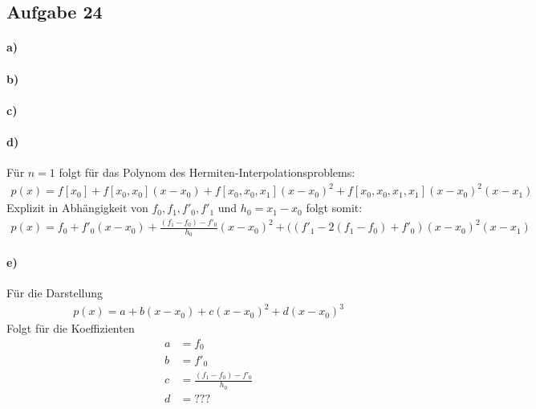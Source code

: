 \subsection*{Aufgabe 24}

\paragraph*{a)}


\paragraph*{b)}


\paragraph*{c)}


\paragraph*{d)}
Für $n=1$ folgt für das Polynom des Hermiten-Interpolationsproblems:
\begin{align*}
	p(x) = f[x_0] + f[x_0,x_0](x-x_0) + f[x_0,x_0,x_1](x-x_0)^2 + f[x_0,x_0,x_1,x_1](x-x_0)^2(x-x_1)
\end{align*}
Explizit in Abhängigkeit von $f_0,f_1,f'_0,f'_1$ und $h_0=x_1-x_0$ folgt somit:
\begin{align*}
	p(x) = f_0 + f'_0(x-x_0) + \frac{(f_1-f_0)-f'_0}{h_0}(x-x_0)^2 +  ((f'_1-2(f_1-f_0)+f'_0)(x-x_0)^2(x-x_1)
\end{align*}
\paragraph*{e)} 
Für die Darstellung
\begin{align*}
p(x) = a + b(x-x_0) + c(x-x_0)^2 +  d(x-x_0)^3
\end{align*}
Folgt für die Koeffizienten
\begin{align*}
a &= f_0\\
b &= f'_0\\
c &= \frac{(f_1-f_0)-f'_0}{h_0}\\
d &= ???\\
\end{align*}